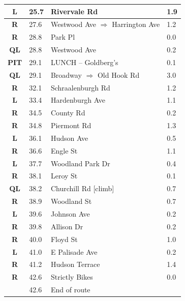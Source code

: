 \documentclass[11pt]{article}
\begin{document}
\begin{center}
\begin{supertabular}{|c|p{0.30in}|p{2.25in}|l|}
 \textbf{L} &  25.7 & Rivervale Rd &   1.9 \\ \hline
{} \textbf{R} &  27.6 & Westwood Ave $\Rightarrow$ Harrington Ave &   1.2 \\ \hline
{} \textbf{R} &  28.8 & Park Pl &   0.0 \\ \hline
 \textbf{QL} &  28.8 & Westwood Ave &   0.2 \\ \hline
{} \textbf{PIT} &  29.1 & LUNCH -- Goldberg's &   0.1 \\ \hline
 \textbf{QL} &  29.1 & Broadway $\Rightarrow$ Old Hook Rd &   3.0 \\ \hline
{} \textbf{R} &  32.1 & Schraalenburgh Rd &   1.2 \\ \hline
 \textbf{L} &  33.4 & Hardenburgh Ave &   1.1 \\ \hline
{} \textbf{R} &  34.5 & County Rd &   0.2 \\ \hline
{} \textbf{R} &  34.8 & Piermont Rd &   1.3 \\ \hline
 \textbf{L} &  36.1 & Hudson Ave &   0.5 \\ \hline
{} \textbf{R} &  36.6 & Engle St &   1.1 \\ \hline
 \textbf{L} &  37.7 & Woodland Park Dr &   0.4 \\ \hline
{} \textbf{R} &  38.1 & Leroy St &   0.1 \\ \hline
 \textbf{QL} &  38.2 & Churchill Rd [climb] &   0.7 \\ \hline
{} \textbf{R} &  38.9 & Woodland St &   0.7 \\ \hline
 \textbf{L} &  39.6 & Johnson Ave &   0.2 \\ \hline
{} \textbf{R} &  39.8 & Allison Dr &   0.2 \\ \hline
{} \textbf{R} &  40.0 & Floyd St &   1.0 \\ \hline
 \textbf{L} &  41.0 & E Palisade Ave &   0.2 \\ \hline
{} \textbf{R} &  41.2 & Hudson Terrace &   1.4 \\ \hline
{} \textbf{R} &  42.6 & Strictly Bikes &   0.0 \\ \hline
{} \textbf{} &  42.6 & End of route &  \\ \hline

\end{supertabular}
\end{center}
\end{document}
